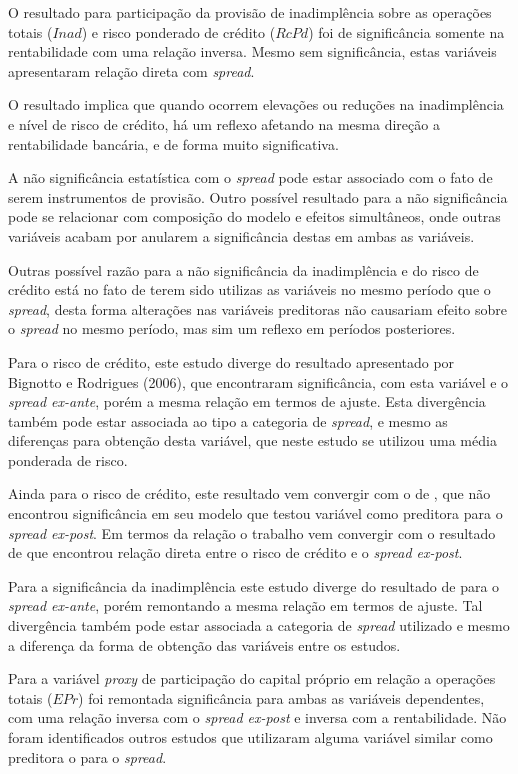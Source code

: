 \documentclass[
  12pt,
  12pt,
  openright,
  oneside,
  a4paper,
  chapter=TITLE,
  section=TITLE,
  subsection=TITLE,
  subsubsection=TITLE,
  english,
  portugues,
  sumario=tradicional]{abntex2}
\begin{document}
O resultado para participação da provisão de inadimplência sobre as operações totais (\(Inad\)) e risco ponderado de crédito (\(RcPd\)) foi de significância somente na rentabilidade com uma relação inversa. Mesmo sem significância, estas variáveis apresentaram relação direta com \emph{spread}.

O resultado implica que quando ocorrem elevações ou reduções na inadimplência e nível de risco de crédito, há um reflexo afetando na mesma direção a rentabilidade bancária, e de forma muito significativa.

A não significância estatística com o \emph{spread} pode estar associado com o fato de serem instrumentos de provisão. Outro possível resultado para a não significância pode se relacionar com composição do modelo e efeitos simultâneos, onde outras variáveis acabam por anularem a significância destas em ambas as variáveis.

Outras possível razão para a não significância da inadimplência e do risco de crédito está no fato de terem sido utilizas as variáveis no mesmo período que o \emph{spread}, desta forma alterações nas variáveis preditoras não causariam efeito sobre o \emph{spread} no mesmo período, mas sim um reflexo em períodos posteriores.

Para o risco de crédito, este estudo diverge do resultado apresentado por Bignotto e Rodrigues (2006), que encontraram significância, com esta variável e o \emph{spread ex-ante}, porém a mesma relação em termos de ajuste. Esta divergência também pode estar associada ao tipo a categoria de \emph{spread}, e mesmo as diferenças para obtenção desta variável, que neste estudo se utilizou uma média ponderada de risco.

Ainda para o risco de crédito, este resultado vem convergir com o de \textcite{almeida:2013}, que não encontrou significância em seu modelo que testou variável como preditora para o \emph{spread ex-post}. Em termos da relação o trabalho vem convergir com o resultado de \textcite{dantas:2012} que encontrou relação direta entre o risco de crédito e o \emph{spread ex-post}.

Para a significância da inadimplência este estudo diverge do resultado de \textcite{durigan:2018} para o \emph{spread ex-ante}, porém remontando a mesma relação em termos de ajuste. Tal divergência também pode estar associada a categoria de \emph{spread} utilizado e mesmo a diferença da forma de obtenção das variáveis entre os estudos.

Para a variável \emph{proxy} de participação do capital próprio em relação a operações totais (\(EPr\)) foi remontada significância para ambas as variáveis dependentes, com uma relação inversa com o \emph{spread ex-post} e inversa com a rentabilidade. Não foram identificados outros estudos que utilizaram alguma variável similar como preditora o para o \emph{spread}.
\end{document}

